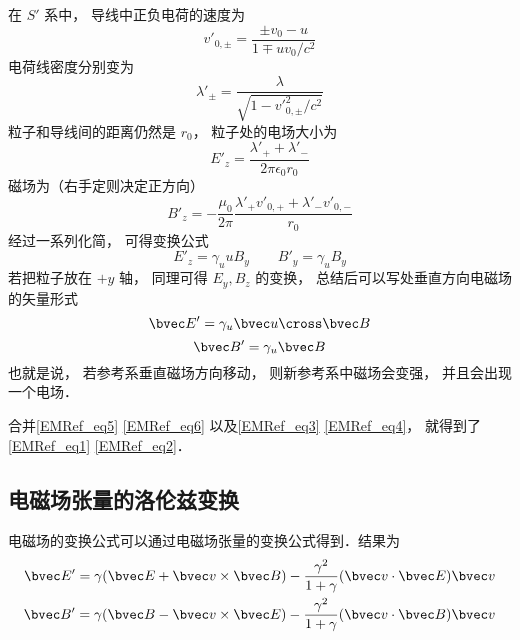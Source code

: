 在 $S'$ 系中， 导线中正负电荷的速度为
\begin{equation}
v'_{0, \pm} = \frac{\pm v_0-u}{1 \mp uv_0/c^2}
\end{equation}
电荷线密度分别变为
\begin{equation}
\lambda'_\pm = \frac{\lambda}{\sqrt{1 - v'^2_{0,\pm}/c^2}}
\end{equation}
粒子和导线间的距离仍然是 $r_0$， 粒子处的电场大小为
\begin{equation}
E'_z = \frac{\lambda'_+ + \lambda'_-}{2 \pi \epsilon_{0} r_0}
\end{equation}
磁场为（右手定则决定正方向）
\begin{equation}
B'_z = -\frac{\mu_0}{2\pi} \frac{\lambda'_+ v'_{0,+} + \lambda'_- v'_{0,-}}{r_0}
\end{equation}
经过一系列化简， 可得变换公式
\begin{equation}
E'_z = \gamma_u u B_y
\qquad
B'_y = \gamma_u B_y
\end{equation}
若把粒子放在 $+y$ 轴， 同理可得 $E_y, B_z$ 的变换， 总结后可以写处垂直方向电磁场的矢量形式
\begin{equation}\label{EMRef_eq3}
\bvec E' = \gamma_u \bvec u \cross \bvec B
\end{equation}
\begin{equation}\label{EMRef_eq4}
\bvec B' = \gamma_u \bvec B
\end{equation}
也就是说， 若参考系垂直磁场方向移动， 则新参考系中磁场会变强， 并且会出现一个电场．

合并\autoref{EMRef_eq5} \autoref{EMRef_eq6} 以及\autoref{EMRef_eq3} \autoref{EMRef_eq4}， 就得到了\autoref{EMRef_eq1} \autoref{EMRef_eq2}．


\subsection{电磁场张量的洛伦兹变换}

电磁场的变换公式可以通过电磁场张量的变换公式得到．结果为
\begin{equation}
\begin{aligned}
\bvec E'=\gamma(\bvec E+\bvec v\times \bvec B)-\frac{\gamma^2}{1+\gamma}(\bvec v \cdot \bvec E)\bvec v\\
\bvec B'=\gamma(\bvec B-\bvec v\times \bvec E)-\frac{\gamma^2}{1+\gamma}(\bvec v \cdot \bvec B)\bvec v
\end{aligned}
\end{equation}
